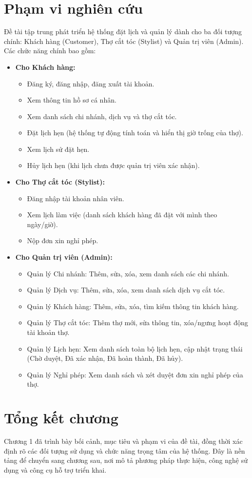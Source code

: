 \documentclass[../BTL.tex]{subfiles}
\begin{document}
\section{Phạm vi nghiên cứu}
Đề tài tập trung phát triển hệ thống đặt lịch và quản lý dành cho ba đối
tượng chính: Khách hàng (Customer), Thợ cắt tóc (Stylist) và Quản trị
viên (Admin). Các chức năng chính bao gồm:

\begin{itemize}
\item
  \textbf{Cho Khách hàng:}

  \begin{itemize}
  \item
    Đăng ký, đăng nhập, đăng xuất tài khoản.
  \item
    Xem thông tin hồ sơ cá nhân.
  \item
    Xem danh sách chi nhánh, dịch vụ và thợ cắt tóc.
  \item
    Đặt lịch hẹn (hệ thống tự động tính toán và hiển thị giờ trống của
    thợ).
  \item
    Xem lịch sử đặt hẹn.
  \item
    Hủy lịch hẹn (khi lịch chưa được quản trị viên xác nhận).
  \end{itemize}
\item
  \textbf{Cho Thợ cắt tóc (Stylist):}

  \begin{itemize}
  \item
    Đăng nhập tài khoản nhân viên.
  \item
    Xem lịch làm việc (danh sách khách hàng đã đặt với mình theo
    ngày/giờ).
  \item
    Nộp đơn xin nghỉ phép.
  \end{itemize}
\item
  \textbf{Cho Quản trị viên (Admin):}

  \begin{itemize}
  \item
    Quản lý Chi nhánh: Thêm, sửa, xóa, xem danh sách các chi nhánh.
  \item
    Quản lý Dịch vụ: Thêm, sửa, xóa, xem danh sách dịch vụ cắt tóc.
  \item
    Quản lý Khách hàng: Thêm, sửa, xóa, tìm kiếm thông tin khách hàng.
  \item
    Quản lý Thợ cắt tóc: Thêm thợ mới, sửa thông tin, xóa/ngưng hoạt
    động tài khoản thợ.
  \item
    Quản lý Lịch hẹn: Xem danh sách toàn bộ lịch hẹn, cập nhật trạng
    thái (Chờ duyệt, Đã xác nhận, Đã hoàn thành, Đã hủy).
  \item
    Quản lý Nghỉ phép: Xem danh sách và xét duyệt đơn xin nghỉ phép của
    thợ.
  \end{itemize}
\end{itemize}

\section{Tổng kết chương}
Chương 1 đã trình bày bối cảnh, mục tiêu và phạm vi của đề tài, đồng
thời xác định rõ các đối tượng sử dụng và chức năng trọng tâm của hệ
thống. Đây là nền tảng để chuyển sang chương sau, nơi mô tả phương pháp
thực hiện, công nghệ sử dụng và công cụ hỗ trợ triển khai.
\end{document}
